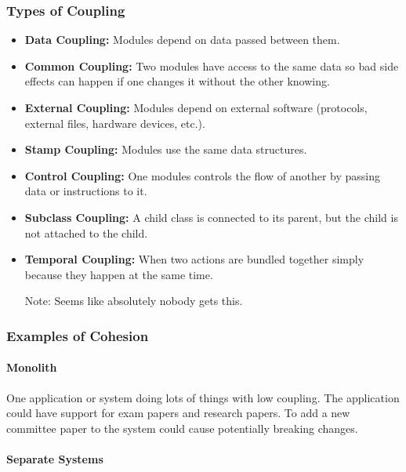 \subsubsection{Types of Coupling}\label{ssub:types_of_coupling}

\begin{itemize}
	\item \textbf{Data Coupling:} Modules depend on data passed between them.
	\item \textbf{Common Coupling:} Two modules have access to the same data so bad side effects can happen if one changes it without the other knowing.
	\item \textbf{External Coupling:} Modules depend on external software (protocols, external files, hardware devices, etc.).
	\item \textbf{Stamp Coupling:} Modules use the same data structures.
	\item \textbf{Control Coupling:} One modules controls the flow of another by passing data or instructions to it.
	\item \textbf{Subclass Coupling:} A child class is connected to its parent, but the child is not attached to the child.
	\item \textbf{Temporal Coupling:} When two actions are bundled together simply because they happen at the same time.
\end{itemize}

\begin{note}
	\begin{itemize}
		\item[Note:] Seems like absolutely nobody gets this.
	\end{itemize}
\end{note}

\subsubsection{Examples of Cohesion}\label{ssub:examples_of_cohesion}

\paragraph{Monolith}\label{par:monolith}

One application or system doing lots of things with low coupling.
The application could have support for exam papers and research papers.
To add a new committee paper to the system could cause potentially breaking changes.

\paragraph{Separate Systems}\label{par:separate_systems}

